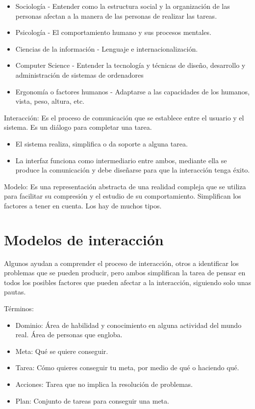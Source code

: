 \documentclass[12pt, twoside, openright]{report} %
\begin{document}
\begin{itemize}
	\item Sociología - Entender como la estructura social y la organización
	      de las personas afectan a la manera de las personas de realizar
	      las tareas.
	\item Psicología - El comportamiento humano y sus procesos mentales.
	\item Ciencias de la información - Lenguaje e internacionalización.
	\item Computer Science - Entender la tecnología y técnicas de diseño,
	      desarrollo y administración de sistemas de ordenadores
	\item Ergonomía o factores humanos - Adaptarse a las capacidades de los
	      humanos, vista, peso, altura, etc.
\end{itemize}

Interacción: Es el proceso de comunicación que se establece entre el
usuario y el sistema. Es un diálogo para completar una tarea.

\begin{itemize}
	\item El sistema realiza, simplifica o da soporte a alguna tarea.
	\item La interfaz funciona como intermediario entre ambos, mediante ella
	      se produce la comunicación y debe diseñarse para que la
	      interacción tenga éxito.
\end{itemize}

Modelo: Es una representación abstracta de una realidad compleja que
se utiliza para facilitar su compresión y el estudio de su
comportamiento. Simplifican los factores a tener en cuenta. Los hay
de muchos tipos.

\section{Modelos de interacción}

Algunos ayudan a comprender el proceso de interacción, otros a
identificar los problemas que se pueden producir, pero ambos
simplifican la tarea de pensar en todos los posibles factores que
pueden afectar a la interacción, siguiendo solo unas pautas.

Términos:

\begin{itemize}
	\item Dominio: Área de habilidad y conocimiento en alguna actividad del
	      mundo real. Área de personas que engloba.
	\item Meta: Qué se quiere conseguir.
	\item Tarea: Cómo quieres conseguir tu meta, por medio de qué o haciendo
	      qué.
	\item Acciones: Tarea que no implica la resolución de problemas.
	\item Plan: Conjunto de tareas para conseguir una meta.
\end{itemize}
\end{document}
